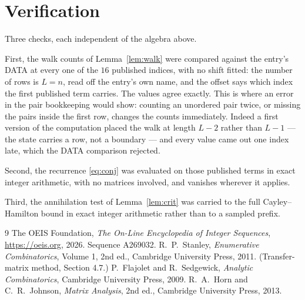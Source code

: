 \documentclass[11pt,a4paper]{article}
\theoremstyle{plain}
\theoremstyle{definition}
\begin{document}
\section{Verification}

Three checks, each independent of the algebra above.

First, the walk counts of Lemma~\ref{lem:walk} were compared against the entry's DATA at
every one of the $16$ published indices, with no shift fitted: the number of rows is
$L=n$, read off the entry's own name, and the offset says which index the first
published term carries. The values agree exactly. This is where an error in the pair
bookkeeping would show: counting an unordered pair twice, or missing the pairs inside the
first row, changes the counts immediately. Indeed a first version of the computation
placed the walk at length $L-2$ rather than $L-1$ --- the state carries a row, not a
boundary --- and every value came out one index late, which the DATA comparison rejected.

Second, the recurrence \eqref{eq:conj} was evaluated on those published terms in exact
integer arithmetic, with no matrices involved, and vanishes wherever it applies.

Third, the annihilation test of Lemma~\ref{lem:crit} was carried to the full
Cayley--Hamilton bound in exact integer arithmetic rather than to a sampled prefix.

\begin{thebibliography}{9}
 The OEIS Foundation, \emph{The On-Line Encyclopedia of Integer
Sequences}, \url{https://oeis.org}, 2026. Sequence A269032.
 R.~P.~Stanley, \emph{Enumerative Combinatorics}, Volume 1, 2nd ed.,
Cambridge University Press, 2011. (Transfer-matrix method, Section 4.7.)
 P.~Flajolet and R.~Sedgewick, \emph{Analytic Combinatorics}, Cambridge
University Press, 2009.
 R.~A.~Horn and C.~R.~Johnson, \emph{Matrix Analysis}, 2nd ed., Cambridge
University Press, 2013.
\end{thebibliography}
\end{document}
